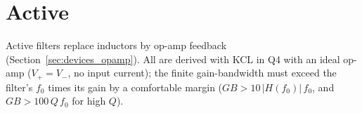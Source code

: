 \section{Active}
Active filters replace inductors by op-amp feedback
(Section~\ref{sec:devices_opamp}). All are derived with KCL in Q4 with an
ideal op-amp (\(V_+ = V_-\), no input current); the finite gain-bandwidth
must exceed the filter's \(f_0\) times its gain by a comfortable margin
(\(GB > 10\,|H(f_0)|\,f_0\), and \(GB > 100\,Q\,f_0\) for high \(Q\)).




